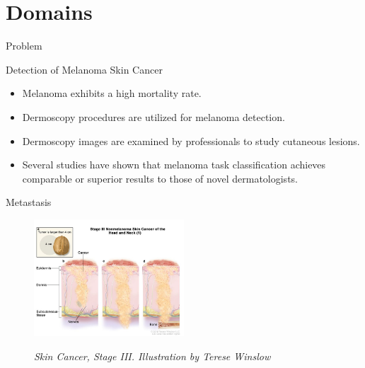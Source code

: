 \documentclass[dvipsnames,mathserif]{beamer}
\begin{document}
{    \section{Domains}

    \begin{frame}
      \begin{center}
        \Huge Problem
      \end{center}
    \end{frame}


    \begin{frame}
      \large Detection of Melanoma Skin Cancer
      \vspace{0.25cm}

      \footnotesize
      \begin{itemize}
        \item Melanoma exhibits a high mortality rate.
        \item Dermoscopy procedures are utilized for melanoma detection.
        \item Dermoscopy images are examined by professionals to study cutaneous lesions.
        \item Several studies have shown that melanoma task classification
          achieves comparable or superior results to those of novel
          dermatologists.
      \end{itemize}


    \end{frame}



    \begin{frame}

    \large Metastasis
      \vspace{0.25cm}

      \footnotesize
    \begin{figure}[H] \centering
      \includegraphics[width=0.5\textwidth]{images/stage3-skin-cancer.jpg}
      \caption[Skin Cancer, Stage III]{\textit{Skin Cancer, Stage III. Illustration by
    Terese Winslow}} {\label{fig:stage3-skin-canceer}} \end{figure}


\end{frame}}
\end{document}
